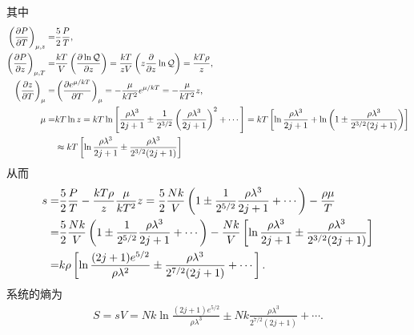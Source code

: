 \documentclass{assignment}
\begin{document}
\begin{pf}
    其中
    \begin{align}
        \left(\frac{\partial P}{\partial T}\right)_{\mu,z}=&\frac{5}{2}\frac{P}{T},\\
        \left(\frac{\partial P}{\partial z}\right)_{\mu,T}=&\frac{kT}{V}\left(\frac{\partial\ln\mathcal{Q}}{\partial z}\right)=\frac{kT}{zV}\left(z\frac{\partial}{\partial z}\ln\mathcal{Q}\right)=\frac{kT\rho}{z},\\
        \left(\frac{\partial z}{\partial T}\right)_{\mu}=&\left(\frac{\partial e^{\mu/kT}}{\partial T}\right)_{\mu}=-\frac{\mu}{kT^2}e^{\mu/kT}=-\frac{\mu}{kT^2}z,\\
        \notag\mu=&kT\ln z=kT\ln\left[\frac{\rho\lambda^3}{2j+1}\pm\frac{1}{2^{3/2}}\left(\frac{\rho\lambda^3}{2j+1}\right)^2+\cdots\right]=kT\left[\ln\frac{\rho\lambda^3}{2j+1}+\ln\left(1\pm\frac{\rho\lambda^3}{2^{3/2}(2j+1)}\right)\right]\\
        &\approx kT\left[\ln\frac{\rho\lambda^3}{2j+1}\pm\frac{\rho\lambda^3}{2^{3/2}(2j+1)}\right]
    \end{align}
    从而
    \begin{align}
        \notag s=&\frac{5}{2}\frac{P}{T}-\frac{kT\rho}{z}\frac{\mu}{kT^2}z=\frac{5}{2}\frac{Nk}{V}\left(1\pm\frac{1}{2^{5/2}}\frac{\rho\lambda^3}{2j+1}+\cdots\right)-\frac{\rho\mu}{T}\\
        \notag=&\frac{5}{2}\frac{Nk}{V}\left(1\pm\frac{1}{2^{5/2}}\frac{\rho\lambda^3}{2j+1}+\cdots\right)-\frac{Nk}{V}\left[\ln\frac{\rho\lambda^3}{2j+1}\pm\frac{\rho\lambda^3}{2^{3/2}(2j+1)}\right]\\
        =&k\rho\left[\ln\frac{(2j+1)e^{5/2}}{\rho\lambda^2}\pm\frac{\rho\lambda^3}{2^{7/2}(2j+1)}+\cdots\right].
    \end{align}
    系统的熵为
    \begin{align}
        S=sV=Nk\ln\frac{(2j+1)e^{5/2}}{\rho\lambda^3}\pm Nk\frac{\rho\lambda^3}{2^{7/2}(2j+1)}+\cdots.
    \end{align}
\end{pf}
\end{document}
